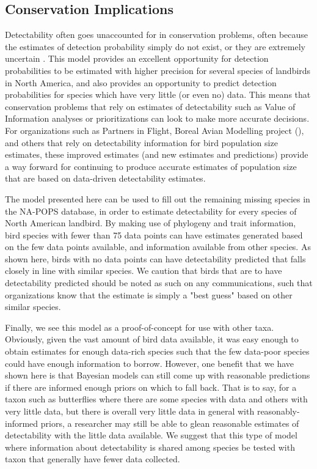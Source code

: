 \documentclass[12pt]{article}
\begin{document}
\subsection{Conservation Implications}
\par Detectability often goes unaccounted for in conservation problems, often because the estimates of detection probability simply do not exist, or they are extremely uncertain \citep{bennett_how_2023}.
This model provides an excellent opportunity for detection probabilities to be estimated with higher precision for several species of landbirds in North America, and also provides an opportunity to predict detection probabilities for species which have very little (or even no) data.
This means that conservation problems that rely on estimates of detectability such as Value of Information analyses \citep{canessa_when_2015, bennett_when_2018} or prioritizations \citep{hanson_prioritizr_2023} can look to make more accurate decisions.
For organizations such as Partners in Flight, Boreal Avian Modelling project (\citep{cumming_toward_2010}), and others that rely on detectability information for bird population size estimates, these improved estimates (and new estimates and predictions) provide a way forward for continuing to produce accurate estimates of population size that are based on data-driven detectability estimates.

\par The model presented here can be used to fill out the remaining missing species in the NA-POPS database, in order to estimate detectability for every species of North American landbird.
By making use of phylogeny and trait information, bird species with fewer than 75 data points can have estimates generated based on the few data points available, and information available from other species.
As shown here, birds with no data points can have detectability predicted that falls closely in line with similar species.
We caution that birds that are to have detectability predicted should be noted as such on any communications, such that organizations know that the estimate is simply a "best guess" based on other similar species.

\par Finally, we see this model as a proof-of-concept for use with other taxa.
Obviously, given the vast amount of bird data available, it was easy enough to obtain estimates for enough data-rich species such that the few data-poor species could have enough information to borrow.
However, one benefit that we have shown here is that Bayesian models can still come up with reasonable predictions if there are informed enough priors on which to fall back.
That is to say, for a taxon such as butterflies where there are some species with data and others with very little data, but there is overall very little data in general \citep{lewthwaite_geographical_2022} with reasonably-informed priors, a researcher may still be able to glean reasonable estimates of detectability with the little data available.
We suggest that this type of model where information about detectability is shared among species be tested with taxon that generally have fewer data collected.


\end{document}
